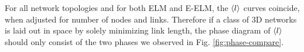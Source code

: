 \documentclass[nofootinbib,preprint,floatfix,endfloats]{revtex4} %
\begin{document}
For all network topologies and for both ELM and E-ELM, the $\left<l\right>$ curves coincide, 
when adjusted for number of nodes and links. Therefore if a class of 3D networks is laid out in space by solely minimizing link length, the phase diagram of $\left<l\right>$ should only consist of the two phases we observed in Fig. \ref{fig:phase-compare}. 
%
\end{document}
